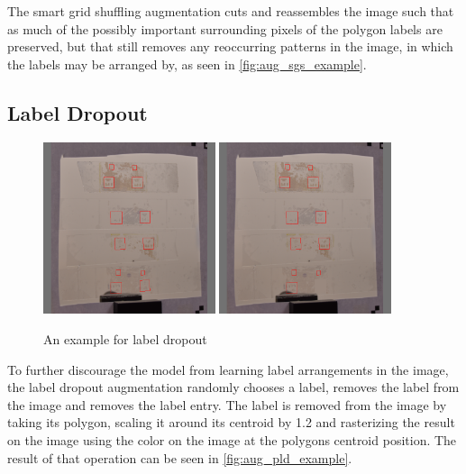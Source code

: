 \documentclass[10pt]{book}
\begin{document}
The smart grid shuffling augmentation cuts and reassembles the image such that as much of the possibly important surrounding pixels of the polygon labels are preserved, but that still removes any reoccurring patterns in the image, in which the labels may be arranged by, as seen in \autoref{fig:aug_sgs_example}.

\subsection{Label Dropout}
\label{sec:aug_ld}

\begin{figure}
  \centering
     {\includegraphics[width=0.45\textwidth]{image/aug_pld_before}}
     {\includegraphics[width=0.45\textwidth]{image/aug_pld_after}}
  \caption{An example for label dropout}
  \label{fig:aug_pld_example}
\end{figure}

To further discourage the model from learning label arrangements in the image, the label dropout augmentation randomly chooses a label, removes the label from the image and removes the label entry. The label is removed from the image by taking its polygon, scaling it around its centroid by 1.2 and rasterizing the result on the image using the color on the image at the polygons centroid position. The result of that operation can be seen in \autoref{fig:aug_pld_example}.
\end{document}
